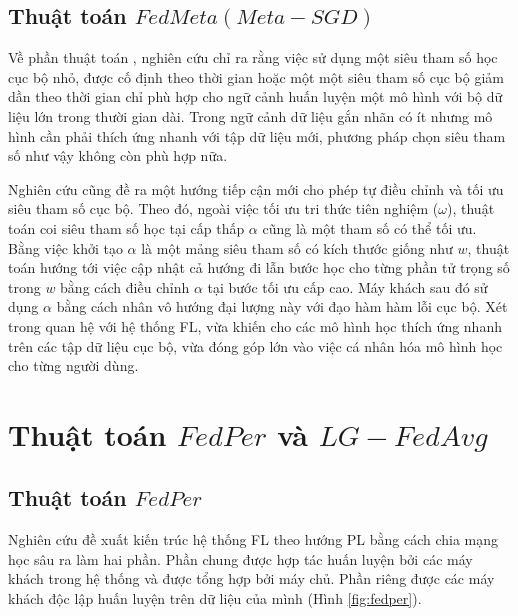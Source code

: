 \subsection{Thuật toán $FedMeta(Meta-SGD)$}

Về phần thuật toán , nghiên cứu \cite{li2017meta} chỉ ra rằng việc sử dụng một siêu tham số học cục bộ nhỏ, được cố định theo thời gian hoặc một một siêu tham số cục bộ giảm dần theo thời gian chỉ phù hợp cho ngữ cảnh huấn luyện một mô hình với bộ dữ liệu lớn trong thười gian dài. Trong ngữ cảnh dữ liệu gắn nhãn có ít nhưng mô hình cần phải thích ứng nhanh với tập dữ liệu mới, phương pháp chọn siêu tham số như vậy không còn phù hợp nữa.

Nghiên cứu cũng đề ra một hướng tiếp cận mới cho phép tự điều chỉnh và tối ưu siêu tham số cục bộ. Theo đó, ngoài việc tối ưu tri thức tiên nghiệm ($\omega$), thuật toán coi siêu tham số học tại cấp thấp $\alpha$ cũng là một tham số có thể tối ưu. Bằng việc khởi tạo $\alpha$ là một mảng siêu tham số có kích thước giống như $w$, thuật toán hướng tới việc cập nhật cả hướng đi lẫn bước học cho từng phần tử trọng số trong $w$ bằng cách điều chỉnh $\alpha$ tại bước tối ưu cấp cao. Máy khách sau đó sử dụng $\alpha$ bằng cách nhân vô hướng đại lượng này với đạo hàm hàm lỗi cục bộ. Xét trong quan hệ với hệ thống FL,  vừa khiến cho các mô hình học thích ứng nhanh trên các tập dữ liệu cục bộ, vừa đóng góp lớn vào việc cá nhân hóa mô hình học cho từng người dùng.

\section{Thuật toán $FedPer$ và $LG-FedAvg$}


\subsection{Thuật toán $FedPer$}

Nghiên cứu \cite{arivazhagan2019federated} đề xuất kiến trúc hệ thống FL theo hướng PL bằng cách chia mạng học sâu ra làm hai phần. Phần chung được hợp tác huấn luyện bởi các máy khách trong hệ thống và được tổng hợp bởi máy chủ. Phần riêng được các máy khách độc lập huấn luyện trên dữ liệu của mình (Hình \ref{fig:fedper}).

